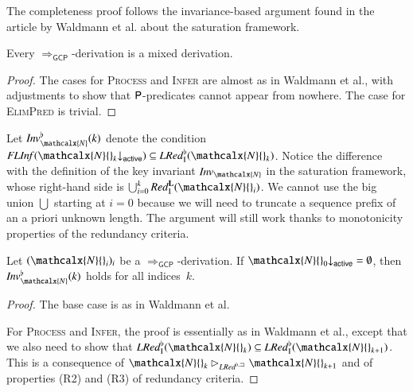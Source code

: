 \begin{rep}
\begin{sloppypar}
   The completeness proof follows the invariance-based argument found in the
   article by Waldmann et al. \cite{waldmann-et-al-202x-article} about the saturation framework.
\end{sloppypar}

\begin{lemma}
\label{lem:gcp-derivations-are-red-black-derivations}
Every $\Longrightarrow_\mathsf{GCP}$-derivation is a mixed derivation.
\end{lemma}

\begin{proof}
   The cases for \textsc{Process} and \textsc{Infer} are almost as in Waldmann et
al., with adjustments to show that $\mathsf{P}$-predicates cannot appear from
nowhere. The case for \textsc{ElimPred} is trivial.
\end{proof}

Let $\Inv\Wksup_\mathcalx{N}(k)$ denote the condition
$\textstyle\FLInf(\mathcalx{N}{}_k{\downarrow}_\mathsf{active}) \subseteq
\LRedIWk(\mathcalx{N}{}_k)$. \vspace{0.5em}
Notice the difference with the definition of the key invariant
$\Inv_\mathcalx{N}$ in the saturation framework, whose right-hand side is
$\bigcup_{i=0}^k \RedI^{\Lab}(\mathcalx{N}{}_i)$. We cannot use the
big union ${\bigcup}$ starting at $i = 0$ because we will need to truncate a
sequence prefix of an a priori unknown length. The argument will still work
thanks to monotonicity properties of the redundancy criteria.

\begin{lemma}
\label{lem:gcp-invar-gcp}
Let $(\mathcalx{N}{}_i)_i$ be a $\Longrightarrow_\mathsf{GCP}$-derivation.
If
$\mathcalx{N}{}_0{\downarrow}_\mathsf{active} = \emptyset$,
then
$\Inv\Wksup_\mathcalx{N}(k)$ holds for all indices~$k$.
\end{lemma}

\begin{proof}
The base case is as in Waldmann et al.

For \textsc{Process} and \textsc{Infer}, the proof is essentially as in Waldmann
et al., except that we also need to show that
$\LRedIWk(\mathcalx{N}{}_k) \subseteq \LRedIWk(\mathcalx{N}{}_{k+1})$.
This is a consequence of
$\mathcalx{N}{}_k \rhd_{\LRedWksub} \mathcalx{N}{}_{k+1}$ and of
properties (R2) and (R3) of redundancy criteria.

\begin{sloppypar}
   

\end{sloppypar}
\end{proof}
\end{rep}
